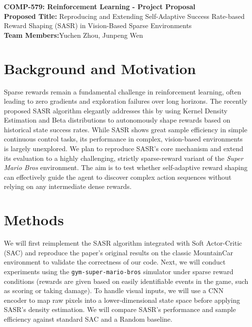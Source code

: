\documentclass[11pt, letterpaper]{article}
\begin{document}
\begin{center}
    \Large \textbf{COMP-579: Reinforcement Learning - Project Proposal} \\[1em]
    \large \textbf{Proposed Title:} Reproducing and Extending Self-Adaptive Success Rate-based Reward Shaping (SASR) in Vision-Based Sparse Environments \\[0.8em]
    \normalsize \textbf{Team Members:}Yuchen Zhou, Junpeng Wen
\end{center}

\vspace{1em}

\section*{Background and Motivation}
Sparse rewards remain a fundamental challenge in reinforcement learning, often leading to zero gradients and exploration failures over long horizons. The recently proposed SASR algorithm \cite{ma2025highly} elegantly addresses this by using Kernel Density Estimation and Beta distributions to autonomously shape rewards based on historical state success rates. While SASR shows great sample efficiency in simple continuous control tasks, its performance in complex, vision-based environments is largely unexplored. We plan to reproduce SASR’s core mechanism and extend its evaluation to a highly challenging, strictly sparse-reward variant of the \textit{Super Mario Bros} environment. The aim is to test whether self-adaptive reward shaping can effectively guide the agent to discover complex action sequences without relying on any intermediate dense rewards.

\section*{Methods}
We will first reimplement the SASR algorithm integrated with Soft Actor-Critic (SAC) \cite{haarnoja2018soft} and reproduce the paper's original results on the classic MountainCar environment to validate the correctness of our code. Next, we will conduct experiments using the \texttt{gym-super-mario-bros} \cite{gym-super-mario-bros} simulator under sparse reward conditions (rewards are given based on easily identifiable events in the game, such as scoring or taking damage). To handle visual inputs, we will use a CNN encoder to map raw pixels into a lower-dimensional state space before applying SASR’s density estimation. We will compare SASR’s performance and sample efficiency against standard SAC and a Random baseline.



\end{document}
